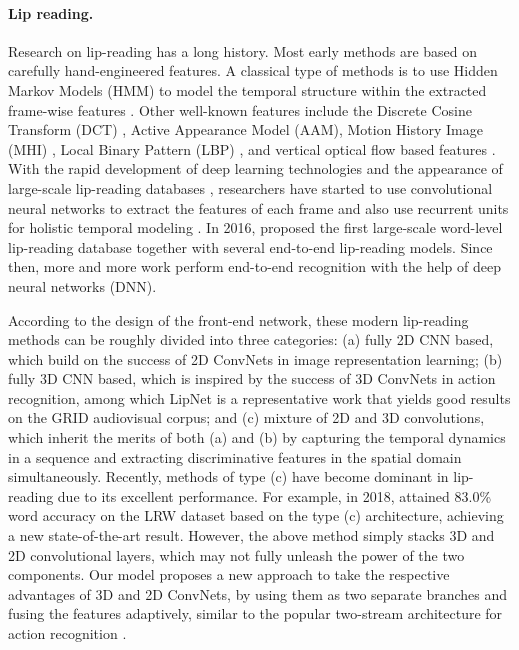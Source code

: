 \documentclass{bmvc2k}
\begin{document}
\paragraph{Lip reading.}Research on lip-reading has a long history. Most early methods are based on carefully hand-engineered features. A classical type of methods is to use Hidden Markov Models (HMM) to model the temporal structure within the extracted frame-wise features \cite{chiou1997lipreading,potamianos2003recent,chandrasekaran2009natural}. Other well-known features include the Discrete Cosine Transform (DCT) \cite{potamianos1998image}, Active Appearance Model (AAM), Motion History Image (MHI) \cite{duchnowski1995toward}, Local Binary Pattern (LBP) \cite{zhao2009lipreading}, and vertical optical flow based features \cite{shaikh2010lip}. With the rapid development of deep learning technologies and the appearance of large-scale lip-reading databases \cite{chung2016lip,1chung2017lip,yang2018lrw}, researchers have started to use convolutional neural networks to extract the features of each frame and also use recurrent units for holistic temporal modeling \cite{noda2015audio,thangthai2015improving,almajai2016improved}. In 2016, \cite{chung2016lip} proposed the first large-scale word-level lip-reading database together with several end-to-end lip-reading models. Since then, more and more work perform end-to-end recognition with the help of deep neural networks (DNN).

According to the design of the front-end network, these modern lip-reading methods can be roughly divided into three categories: (a) fully 2D CNN based, which build on the success of 2D ConvNets in image representation learning;  
(b) fully 3D CNN based, which is inspired by the success of 3D ConvNets in action recognition, among which LipNet\cite{assael2016lipnet} is a representative work that yields good results on the GRID audiovisual corpus; and (c) mixture of 2D and 3D convolutions, which inherit the merits of both (a) and (b) by capturing the temporal dynamics in a sequence and extracting discriminative features in the spatial domain simultaneously. Recently, methods of type (c) have become dominant in lip-reading due to its excellent performance. For example, in 2018, \cite{1petridis2018end} attained $83.0$\% word accuracy on the LRW dataset based on the type (c) architecture, achieving a new state-of-the-art result. However, the above method simply stacks 3D and 2D convolutional layers, which may not fully unleash the power of the two components. Our model proposes a new approach to take the respective advantages of 3D and 2D ConvNets, by using them as two separate branches and fusing the features adaptively, similar to the popular two-stream architecture for action recognition \cite{simonyan2014two}.
\vspace{-1.5em}
\end{document}
